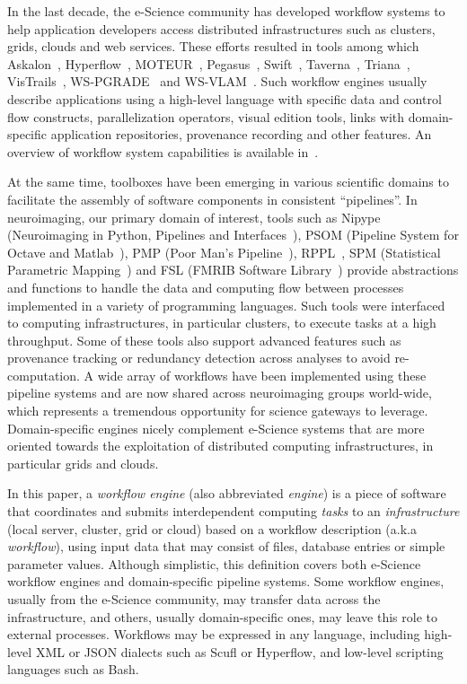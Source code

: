 \documentclass[preprint,3p,twocolumn]{elsarticle}
\begin{document}
\label{sec:introduction-engines}
In the last decade, the e-Science community has developed workflow
systems to help application developers access distributed
infrastructures such as clusters, grids, clouds and web
services. These efforts resulted in tools among which
Askalon~\cite{fahringer2005askalon},
Hyperflow~\cite{balis2016hyperflow}, MOTEUR~\cite{GLAT-08i},
Pegasus~\cite{deelman2005pegasus,Deelman201517},
Swift~\cite{zhao2007swift}, Taverna~\cite{oinn2004taverna},
Triana~\cite{taylor2007triana}, VisTrails~\cite{callahan2006managing},
WS-PGRADE~\cite{Kacsuk2012} and
WS-VLAM~\cite{wsvlam}.  Such workflow engines usually describe
applications using a high-level language with specific data and control
flow constructs, parallelization operators, visual edition tools,
links with domain-specific application repositories, provenance
recording and other features. An overview of workflow system
capabilities is available in~\cite{deelman2009workflows}.

At the same time, toolboxes have been emerging in various scientific
domains to facilitate the assembly of software components in
consistent ``pipelines''. In neuroimaging, our primary domain of
interest, tools such as Nipype (Neuroimaging in Python, Pipelines and
Interfaces~\cite{gorgolewski2011nipype}), PSOM (Pipeline System for
Octave and Matlab~\cite{bellec2012pipeline}), 
PMP (Poor Man's Pipeline~\cite{Ad-DabbaghY2006}), RPPL~\cite{1174106}, SPM (Statistical
Parametric Mapping~\cite{ashburner2011spm}) and FSL (FMRIB Software
Library~\cite{Jenkinson2012782}) provide abstractions and functions to
handle the data and computing flow between processes implemented in a
variety of programming languages. Such tools were interfaced to
computing infrastructures, in particular
clusters, to execute tasks at a high throughput. Some of
these tools also support advanced features such as provenance
tracking or  redundancy detection across
analyses to avoid re-computation. A wide array of workflows
have been implemented using these pipeline systems and are now shared across
neuroimaging groups world-wide, which represents a tremendous
opportunity for science gateways to leverage. Domain-specific engines
nicely complement e-Science systems that are more oriented towards the
exploitation of distributed computing infrastructures, in particular
grids and clouds.

In this paper, a
\emph{workflow engine} (also abbreviated \emph{engine}) is a piece of
software that coordinates and submits interdependent computing \emph{tasks} to an
\emph{infrastructure} (local server, cluster, grid or cloud) based on
a workflow description (a.k.a \emph{workflow}), using input data
that may consist of files, database entries or simple parameter
values. Although simplistic, this definition covers both e-Science workflow engines and
domain-specific pipeline systems.
Some workflow engines, 
usually from the e-Science community, 
may transfer data across the infrastructure, and others, usually
domain-specific ones, may leave this role to external processes. Workflows
may be expressed in any language, including high-level XML or JSON
dialects such as Scufl or Hyperflow, and low-level scripting languages
such as Bash.
\end{document}
